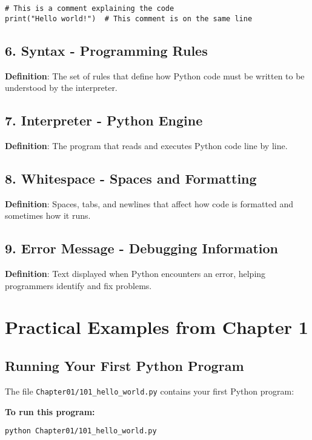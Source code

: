 \begin{lstlisting}
# This is a comment explaining the code
print("Hello world!")  # This comment is on the same line
\end{lstlisting}

\subsection*{6. Syntax - Programming Rules}
\textbf{Definition}: The set of rules that define how Python code must be written to be understood by the interpreter.

\subsection*{7. Interpreter - Python Engine}
\textbf{Definition}: The program that reads and executes Python code line by line.

\subsection*{8. Whitespace - Spaces and Formatting}
\textbf{Definition}: Spaces, tabs, and newlines that affect how code is formatted and sometimes how it runs.

\subsection*{9. Error Message - Debugging Information}
\textbf{Definition}: Text displayed when Python encounters an error, helping programmers identify and fix problems.

\section*{Practical Examples from Chapter 1}

\subsection*{Running Your First Python Program}
The file \texttt{Chapter01/101\_hello\_world.py} contains your first Python program:



\textbf{To run this program:}
\begin{verbatim}
python Chapter01/101_hello_world.py
\end{verbatim}

